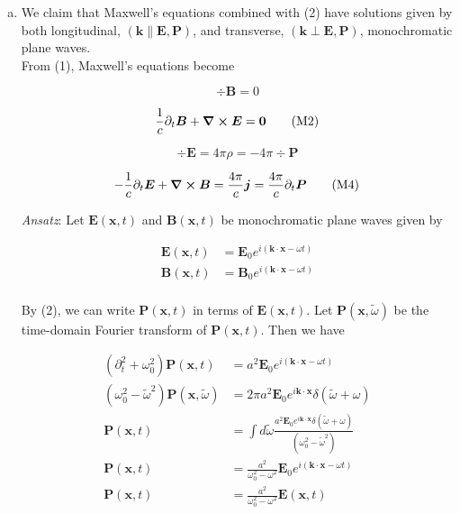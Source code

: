\documentclass[]{article}
\begin{document}
\begin{enumerate}[a)]

\item We claim that Maxwell's equations combined with (2) have solutions given by both longitudinal, $( \bm{k} \parallel \bm{E}, \bm{P})$, and transverse, $( \bm{k} \perp \bm{E}, \bm{P})$, monochromatic plane waves. \\
From (1), Maxwell's equations become

\begin{equation}
\div \bm{B} = 0  \tag{M1}
\end{equation}

\begin{equation}
\frac{1}{c} \partial_t \bm{B} + \curl \bm{E} = \bm{0}  \tag{M2}
\end{equation}

\begin{equation}
\div \bm{E} = 4\pi\rho  = -  4\pi \div \bm{P}    \tag{M3}
\end{equation}

\begin{equation}
-\frac{1}{c} \partial_t \bm{E} + \curl \bm{B} = \frac{4\pi}{c} \bm{j} =  \frac{4\pi}{c} \partial_t \bm{P}   \tag{M4}
\end{equation}

{\it Ansatz}:  Let $\bm{E}(\bm{x}, t)$ and $\bm{B}(\bm{x}, t)$ be monochromatic plane waves given by 


\begin{equation}
\begin{split}
\bm{E}(\bm{x}, t) & =  \bm{E}_0 e^{i(\bm{k}\cdot\bm{x} - \omega t)} \\
\bm{B}(\bm{x}, t) & =  \bm{B}_0 e^{i(\bm{k}\cdot\bm{x} - \omega t)} \\
\end{split}
\end{equation}

By (2), we can write $\bm{P}(\bm{x}, t)$ in terms of $\bm{E}(\bm{x},t)$. Let $\bm{P}(\bm{x}, \tilde{\omega})$ be the time-domain Fourier transform of $\bm{P}(\bm{x}, t)$. Then we have

\begin{equation}
\begin{split}
(\partial_t^2 + \omega_0^2) \bm{P}(\bm{x}, t) & = a^2 \bm{E}_0 e^{i(\bm{k}\cdot\bm{x} - \omega t)}\\
( \omega_0^2  -  \tilde{\omega}^2) \bm{P}(\bm{x}, \tilde{\omega}) & =  2\pi a^2  \bm{E}_0 e^{i\bm{k}\cdot\bm{x}} \delta( \tilde{\omega} + \omega) \\
\bm{P}(\bm{x}, t) & = \int d\tilde{\omega} \frac{a^2  \bm{E}_0 e^{i\bm{k}\cdot\bm{x}} \delta( \tilde{\omega} + \omega) }{ ( \omega_0^2  -  \tilde{\omega}^2) } \\
\bm{P}(\bm{x}, t) & =  \frac{a^2   }{ \omega_0^2  -  \omega^2 }  \bm{E}_0 e^{i(\bm{k}\cdot\bm{x} - \omega t)} \\
\bm{P}(\bm{x}, t) & =  \frac{a^2   }{ \omega_0^2  -  \omega^2 }  \bm{E}(\bm{x},t) \\
\end{split}
\end{equation}



\end{enumerate}
\end{document}
